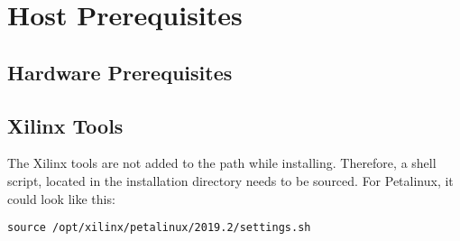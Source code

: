 \section{Host Prerequisites}
\label{sec:embedded_platform:host_prerequisites}

\subsection{Hardware Prerequisites}
\label{subsec:embedded_platform:host_prerequisites:hardware_prerequisites}

\subsection{Xilinx Tools}
\label{subsec:embedded_platform:host_prerequisites:xilinx_tools}
The Xilinx tools are not added to the path while installing.
Therefore, a shell script, located in the installation directory needs to be sourced.
For Petalinux, it could look like this:
\begin{lstlisting}[style=bash, caption={}, label=lst:source_tools]
  source /opt/xilinx/petalinux/2019.2/settings.sh
\end{lstlisting}
